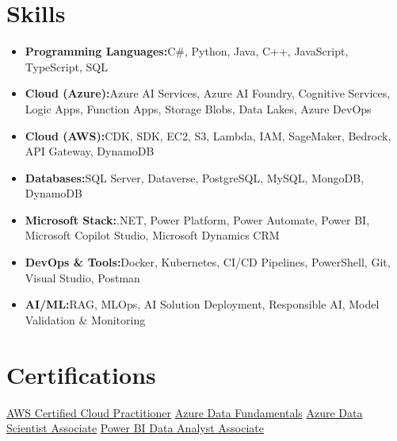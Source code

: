 \documentclass[a4paper,10pt]{article}
\newcommand{\resumeItem}[2]{\item{\textbf{#1}{\hspace{0.5mm}#2 \vspace{-0.5mm}}}}
\newcommand{\resumeSubItem}[2]{\resumeItem{#1}{#2}\vspace{-3pt}}
\newcommand{\resumeHeadingSkillStart}{\begin{itemize}[leftmargin=*, itemsep=0.6mm, rightmargin=2ex]}
\newcommand{\resumeHeadingSkillEnd}{\end{itemize}\vspace{-2mm}}
\begin{document}
\section{\textbf{Skills}}
\resumeHeadingSkillStart
\resumeSubItem{Programming Languages:}{C\#, Python, Java, C++, JavaScript, TypeScript, SQL}
\resumeSubItem{Cloud (Azure):}{Azure AI Services, Azure AI Foundry, Cognitive Services, Logic Apps, Function Apps, Storage Blobs, Data Lakes, Azure DevOps}
\resumeSubItem{Cloud (AWS):}{CDK, SDK, EC2, S3, Lambda, IAM, SageMaker, Bedrock, API Gateway, DynamoDB}
\resumeSubItem{Databases:}{SQL Server, Dataverse, PostgreSQL, MySQL, MongoDB, DynamoDB}
\resumeSubItem{Microsoft Stack:}{.NET, Power Platform, Power Automate, Power BI, Microsoft Copilot Studio, Microsoft Dynamics CRM}
\resumeSubItem{DevOps \& Tools:}{Docker, Kubernetes, CI/CD Pipelines, PowerShell, Git, Visual Studio, Postman}
\resumeSubItem{AI/ML:}{RAG, MLOps, AI Solution Deployment, Responsible AI, Model Validation \& Monitoring}
\resumeHeadingSkillEnd
\vspace{0mm}

\section{\textbf{Certifications}}
\footnotesize{
\href{https://drive.google.com/open?id=1a3exoiS79RS3q8vSJHT-PpkczSPg54EZ}{AWS Certified Cloud Practitioner} \textbar{}
\href{https://drive.google.com/open?id=1VBJjfRMsIm8BckoUtLUV7ZbY88Jju2qT}{Azure Data Fundamentals} \textbar{}
\href{https://drive.google.com/open?id=1IDtiC9HSlFDAWIEs3UvDjSLfHvI_8iSu}{Azure Data Scientist Associate} \textbar{}
\href{https://drive.google.com/open?id=1XaffZ7Grnmp8K8dwTcZymsE-HYHMuM-U}{Power BI Data Analyst Associate}
}
\end{document}
